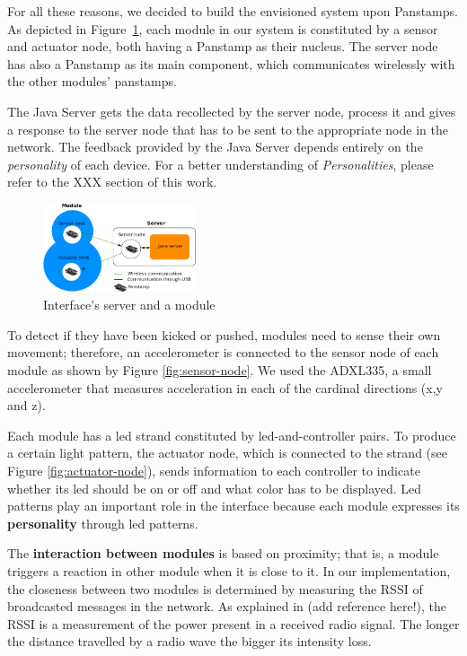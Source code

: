 For all these reasons, we decided to build the envisioned system upon Panstamps. As depicted in Figure~\ref{fig:server-module}, each module in our system is constituted by a sensor and actuator node, both having a Panstamp as their nucleus. The server node has also a Panstamp as its main component, which communicates wirelessly with the other modules' panstamps. 

The Java Server gets the data recollected by the server node, process it and gives a response to the server node that has to be sent to the appropriate node in the network. The feedback provided by the Java Server depends entirely on the \emph{personality} of each device. For a better understanding of \emph{Personalities}, please refer to the XXX section of this work.

\begin{figure}[h!]
 \centering
 \includegraphics[width= 0.4\textwidth, clip=true  ,keepaspectratio=true]{./graph/entity_server.png}
 \caption{Interface's server and a module}
 \label{fig:server-module}
\end{figure}

To detect if they have been kicked or pushed, modules need to sense their own movement; therefore, an accelerometer is connected to the sensor node of each module as shown by Figure \ref{fig:sensor-node}. We used the ADXL335, a small accelerometer that measures acceleration in each of the cardinal directions (x,y and z).

Each module has a led strand constituted by led-and-controller pairs. To produce a certain light pattern, the actuator node, which is connected to the strand (see Figure \ref{fig:actuator-node}), sends information to each controller to indicate whether its led should be on or off and what color has to be displayed. Led patterns play an important role in the interface because each module expresses its \textbf{personality} through led patterns.  

The \textbf{interaction between modules} is based on proximity; that is, a module triggers a reaction in other module when it is close to it. In our implementation, the closeness between two modules is determined by measuring the RSSI of broadcasted messages in the network. As explained in (add reference here!), the RSSI is a measurement of the power present in a received radio signal. The longer the distance travelled by a radio wave the bigger its intensity loss.

